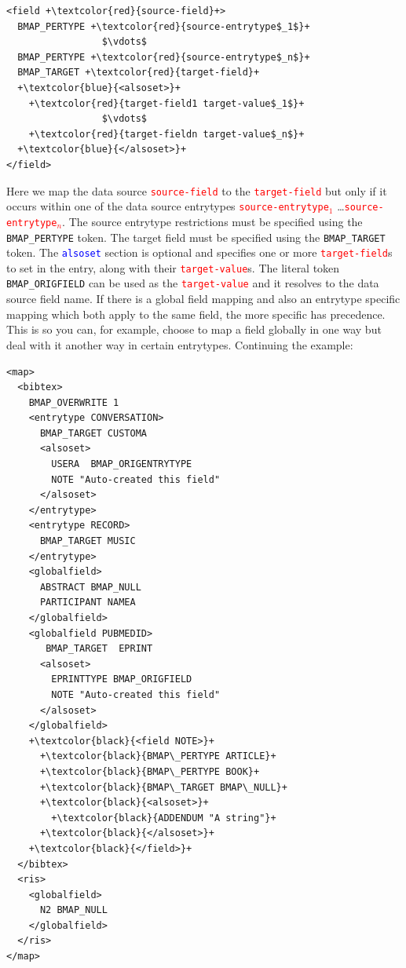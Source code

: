 \documentclass{ltxdockit}
\begin{document}
\lstset{showspaces=false}
\begin{lstlisting}[escapechar=+,mathescape=true]
<field +\textcolor{red}{source-field}+>
  BMAP_PERTYPE +\textcolor{red}{source-entrytype$_1$}+
                 $\vdots$
  BMAP_PERTYPE +\textcolor{red}{source-entrytype$_n$}+
  BMAP_TARGET +\textcolor{red}{target-field}+
  +\textcolor{blue}{<alsoset>}+
    +\textcolor{red}{target-field1 target-value$_1$}+
                 $\vdots$
    +\textcolor{red}{target-fieldn target-value$_n$}+
  +\textcolor{blue}{</alsoset>}+
</field>
\end{lstlisting}

\noindent Here we map the data source
\textcolor{red}{\texttt{source-field}} to the
\textcolor{red}{\texttt{target-field}} but only if it occurs within one of
the data source entrytypes \textcolor{red}{\texttt{source-entrytype$_1$}}
\ldots\linebreak\textcolor{red}{\texttt{source-entrytype$_n$}}. The source
entrytype restrictions must be specified using the \verb+BMAP_PERTYPE+
token. The target field must be specified using the \verb+BMAP_TARGET+
token. The \textcolor{blue}{\texttt{alsoset}} section is optional and
specifies one or more \textcolor{red}{\texttt{target-field}}s to set in the
entry, along with their \textcolor{red}{\texttt{target-value}}s. The
literal token \verb+BMAP_ORIGFIELD+ can be used as the
\textcolor{red}{\texttt{target-value}} and it resolves to the data source
field name. If there is a global field mapping and also an entrytype
specific mapping which both apply to the same field, the more specific has
precedence. This is so you can, for example, choose to map a field globally
in one way but deal with it another way in certain entrytypes. Continuing
the example: 

{\color{grey}
\lstset{showspaces=false}
\begin{lstlisting}[escapechar=+,mathescape=true]
<map>
  <bibtex>
    BMAP_OVERWRITE 1
    <entrytype CONVERSATION>
      BMAP_TARGET CUSTOMA
      <alsoset>
        USERA  BMAP_ORIGENTRYTYPE
        NOTE "Auto-created this field"
      </alsoset>
    </entrytype>
    <entrytype RECORD>
      BMAP_TARGET MUSIC
    </entrytype>
    <globalfield>
      ABSTRACT BMAP_NULL
      PARTICIPANT NAMEA
    </globalfield>
    <globalfield PUBMEDID>
       BMAP_TARGET  EPRINT
      <alsoset>
        EPRINTTYPE BMAP_ORIGFIELD
        NOTE "Auto-created this field"
      </alsoset>
    </globalfield>
    +\textcolor{black}{<field NOTE>}+
      +\textcolor{black}{BMAP\_PERTYPE ARTICLE}+
      +\textcolor{black}{BMAP\_PERTYPE BOOK}+
      +\textcolor{black}{BMAP\_TARGET BMAP\_NULL}+
      +\textcolor{black}{<alsoset>}+
        +\textcolor{black}{ADDENDUM "A string"}+
      +\textcolor{black}{</alsoset>}+
    +\textcolor{black}{</field>}+
  </bibtex>
  <ris>
    <globalfield>
      N2 BMAP_NULL
    </globalfield>
  </ris>
</map>
\end{lstlisting}
}
\end{document}
